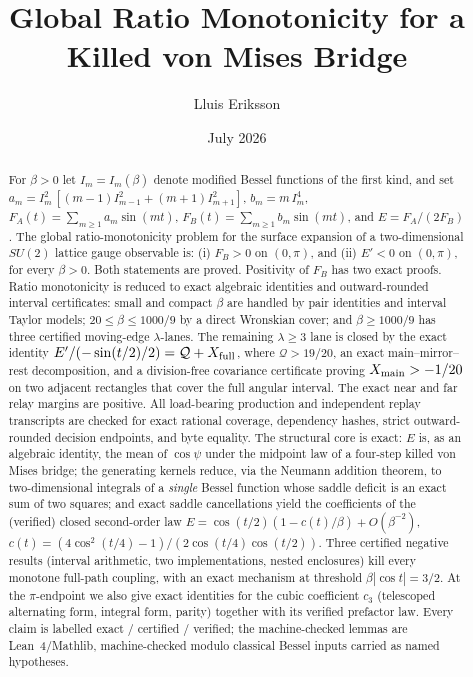 \documentclass[11pt]{article}
\title{Global Ratio Monotonicity for a Killed von Mises Bridge}
\author{Lluis Eriksson}
\date{July 2026}
\theoremstyle{remark}
\newcommand{\FA}{F_{\!A}}
\newcommand{\FB}{F_{\!B}}
\begin{document}
\maketitle

\begin{abstract}
For $\beta>0$ let $I_m=I_m(\beta)$ denote modified Bessel functions of the
first kind, and set $a_m = I_m^2\,[(m-1)I_{m-1}^2+(m+1)I_{m+1}^2]$,
$b_m = m\,I_m^4$, $\FA(t)=\sum_{m\ge1}a_m\sin(mt)$,
$\FB(t)=\sum_{m\ge1}b_m\sin(mt)$, and $E=\FA/(2\FB)$. The global
ratio-monotonicity problem for the surface expansion of a two-dimensional
$SU(2)$ lattice gauge observable is: (i) $\FB>0$ on $(0,\pi)$, and (ii)
$E'<0$ on $(0,\pi)$, for every $\beta>0$.  Both statements are proved.
Positivity of $\FB$ has two exact proofs.  Ratio monotonicity is reduced
to exact algebraic identities and outward-rounded interval certificates:
small and compact $\beta$ are handled by pair identities and interval
Taylor models; $20\le\beta\le1000/9$ by a direct Wronskian cover; and
$\beta\ge1000/9$ has three certified moving-edge $\lambda$-lanes.
The remaining $\lambda\ge3$ lane is closed by the exact identity
$E'/(-\sin(t/2)/2)=\mathcal Q+X_{\rm full}$, where
$\mathcal Q>19/20$, an exact main--mirror--rest decomposition, and a
division-free covariance certificate proving
$X_{\rm main}>-1/20$ on two adjacent rectangles that cover the full angular
interval.  The exact near and far relay margins are positive.  All
load-bearing production and independent replay transcripts are checked for
exact rational coverage, dependency hashes, strict outward-rounded decision
endpoints, and byte equality.  The
structural core is exact: $E$ is, as an algebraic identity, the mean of
$\cos\psi$ under the midpoint law of a four-step killed von Mises
bridge; the generating kernels reduce, via the Neumann addition theorem,
to two-dimensional integrals of a \emph{single} Bessel function whose
saddle deficit is an exact sum of two squares; and exact saddle
cancellations yield the coefficients of the (verified) closed
second-order law $E=\cos(t/2)(1-c(t)/\beta)+O(\beta^{-2})$,
$c(t)=(4\cos^2(t/4)-1)/(2\cos(t/4)\cos(t/2))$. Three certified negative
results (interval arithmetic, two implementations, nested enclosures)
kill every monotone full-path coupling, with an exact mechanism at
threshold $\beta|\cos t|=3/2$.  At the $\pi$-endpoint we also give exact
identities for the cubic coefficient
$c_3$ (telescoped alternating form, integral form, parity) together with
its verified prefactor law. Every claim is labelled exact / certified / verified; the
machine-checked lemmas are Lean~4/Mathlib, machine-checked modulo
classical Bessel inputs carried as named hypotheses.
\end{abstract}
\end{document}
